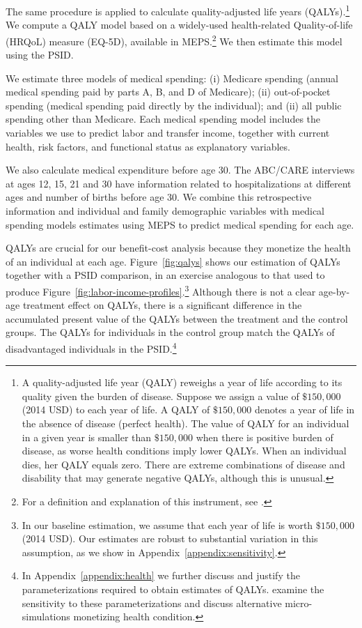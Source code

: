 The same procedure is applied to calculate quality-adjusted life years (QALYs).\footnote{A quality-adjusted life year (QALY) reweighs a year of life according to its quality given the burden of disease. Suppose we assign a value of $\$150,000$ (2014 USD) to each year of life. A QALY of $\$150,000$ denotes a year of life in the absence of disease (perfect health). The value of QALY for an individual in a given year is smaller than $\$150,000$ when there is positive burden of disease, as worse health conditions imply lower QALYs. When an individual dies, her QALY equals zero. There are extreme combinations of disease and disability that may generate negative QALYs, although this is unusual.} We compute a QALY model based on a widely-used health-related Quality-of-life (HRQoL) measure (EQ-5D), available in MEPS.\footnote{For a definition and explanation of this instrument, see \citet{Dolan_1997_Modeling_MC,Shaw_etal_2005_EQ5D_MC}.} We then estimate this model using the PSID.

We estimate three models of medical spending: (i) Medicare spending (annual medical spending paid by parts A, B, and D of Medicare); (ii) out-of-pocket spending (medical spending paid directly by the individual); and (ii) all public spending other than Medicare. Each medical spending model includes the variables we use to predict labor and transfer income, together with current health, risk factors, and functional status as explanatory variables.

We also calculate medical expenditure before age 30. The ABC/CARE interviews at ages 12, 15, 21 and 30 have information related to hospitalizations at different ages and number of births before age 30. We combine this retrospective information and individual and family demographic variables with medical spending models estimates using MEPS to predict medical spending for each age.

QALYs are crucial for our benefit-cost analysis because they monetize the health of an individual at each age. Figure~\ref{fig:qalys} shows our estimation of QALYs together with a PSID comparison, in an exercise analogous to that used to produce Figure~\ref{fig:labor-income-profiles}.\footnote{In our baseline estimation, we assume that each year of life is worth  $\$150,000$ (2014 USD). Our estimates are robust to substantial variation in this assumption, as we show in Appendix~\ref{appendix:sensitivity}.} Although there is not a clear age-by-age treatment effect on QALYs, there is a significant difference in the accumulated present value of the QALYs between the treatment and the control groups. The QALYs for individuals in the control group match the QALYs of disadvantaged individuals in the PSID.\footnote{In Appendix~\ref{appendix:health} we further discuss and justify the parameterizations required to obtain estimates of QALYs. \citet{Goldman_etal_2015_Future-America-Model} examine the sensitivity to these parameterizations and discuss alternative micro-simulations monetizing health condition.}

